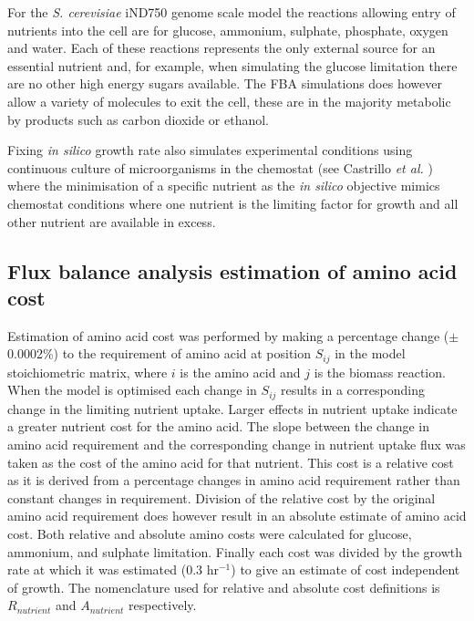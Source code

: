 For the \emph{S. cerevisiae} iND750 \cite{duarte2004a} genome scale model the reactions allowing entry of nutrients into the cell are for glucose, ammonium, sulphate, phosphate, oxygen and water. Each of these reactions represents the only external source for an essential nutrient and, for example, when simulating the glucose limitation there are no other high energy sugars available. The FBA simulations does however allow a variety of molecules to exit the cell, these are in the majority metabolic by products such as carbon dioxide or ethanol.

Fixing \emph{in silico} growth rate also simulates experimental conditions using continuous culture of microorganisms in the chemostat (see Castrillo \emph{et al.} \cite{castrillo2007}) where the minimisation of a specific nutrient as the \emph{in silico} objective mimics chemostat conditions where one nutrient is the limiting factor for growth and all other nutrient are available in excess.

\subsection{Flux balance analysis estimation of amino acid cost}

Estimation of amino acid cost was performed by making a percentage change ($\pm$0.0002\%) to the requirement of amino acid at position $S_{ij}$ in the model stoichiometric matrix, where $i$ is the amino acid and $j$ is the biomass reaction. When the model is optimised each change in $S_{ij}$ results in a corresponding change in the limiting nutrient uptake. Larger effects in nutrient uptake indicate a greater nutrient cost for the amino acid.  The slope between the change in amino acid requirement and the corresponding change in nutrient uptake flux was taken as the cost of the amino acid for that nutrient. This cost is a relative cost as it is derived from a percentage changes in amino acid requirement rather than constant changes in requirement. Division of the relative cost by the original amino acid requirement does however result in an absolute estimate of amino acid cost. Both relative and absolute amino costs were calculated for glucose, ammonium, and sulphate limitation. Finally each cost was divided by the growth rate at which it was estimated (0.3 hr$^{-1}$) to give an estimate of cost independent of growth. The nomenclature used for relative and absolute cost definitions is $R_{nutrient}$ and $A_{nutrient}$ respectively.


